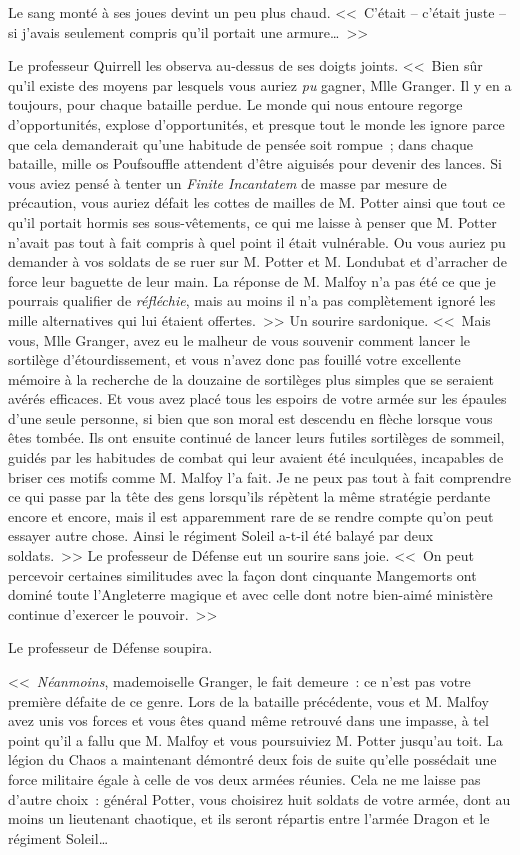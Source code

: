 Le sang monté à ses joues devint un peu plus chaud. <<~C'était -- c'était juste -- si j'avais seulement compris qu'il portait une armure…~>>

Le professeur Quirrell les observa au-dessus de ses doigts joints. <<~Bien sûr qu'il existe des moyens par lesquels vous auriez \emph{pu} gagner, Mlle Granger. Il y en a toujours, pour chaque bataille perdue. Le monde qui nous entoure regorge d'opportunités, explose d'opportunités, et presque tout le monde les ignore parce que cela demanderait qu'une habitude de pensée soit rompue~; dans chaque bataille, mille os Poufsouffle attendent d'être aiguisés pour devenir des lances. Si vous aviez pensé à tenter un \emph{Finite Incantatem} de masse par mesure de précaution, vous auriez défait les cottes de mailles de M. Potter ainsi que tout ce qu'il portait hormis ses sous-vêtements, ce qui me laisse à penser que M. Potter n'avait pas tout à fait compris à quel point il était vulnérable. Ou vous auriez pu demander à vos soldats de se ruer sur M. Potter et M. Londubat et d'arracher de force leur baguette de leur main. La réponse de M. Malfoy n'a pas été ce que je pourrais qualifier de \emph{réfléchie}, mais au moins il n'a pas complètement ignoré les mille alternatives qui lui étaient offertes.~>> Un sourire sardonique. <<~Mais vous, Mlle Granger, avez eu le malheur de vous souvenir comment lancer le sortilège d'étourdissement, et vous n'avez donc pas fouillé votre excellente mémoire à la recherche de la douzaine de sortilèges plus simples que se seraient avérés efficaces. Et vous avez placé tous les espoirs de votre armée sur les épaules d'une seule personne, si bien que son moral est descendu en flèche lorsque vous êtes tombée. Ils ont ensuite continué de lancer leurs futiles sortilèges de sommeil, guidés par les habitudes de combat qui leur avaient été inculquées, incapables de briser ces motifs comme M. Malfoy l'a fait. Je ne peux pas tout à fait comprendre ce qui passe par la tête des gens lorsqu'ils répètent la même stratégie perdante encore et encore, mais il est apparemment rare de se rendre compte qu'on peut essayer autre chose. Ainsi le régiment Soleil a-t-il été balayé par deux soldats.~>> Le professeur de Défense eut un sourire sans joie. <<~On peut percevoir certaines similitudes avec la façon dont cinquante Mangemorts ont dominé toute l'Angleterre magique et avec celle dont notre bien-aimé ministère continue d'exercer le pouvoir.~>>

Le professeur de Défense soupira.

<<~\emph{Néanmoins}, mademoiselle Granger, le fait demeure~: ce n'est pas votre première défaite de ce genre. Lors de la bataille précédente, vous et M. Malfoy avez unis vos forces et vous êtes quand même retrouvé dans une impasse, à tel point qu'il a fallu que M. Malfoy et vous poursuiviez M. Potter jusqu'au toit. La légion du Chaos a maintenant démontré deux fois de suite qu'elle possédait une force militaire égale à celle de vos deux armées réunies. Cela ne me laisse pas d'autre choix~: général Potter, vous choisirez huit soldats de votre armée, dont au moins un lieutenant chaotique, et ils seront répartis entre l'armée Dragon et le régiment Soleil…

